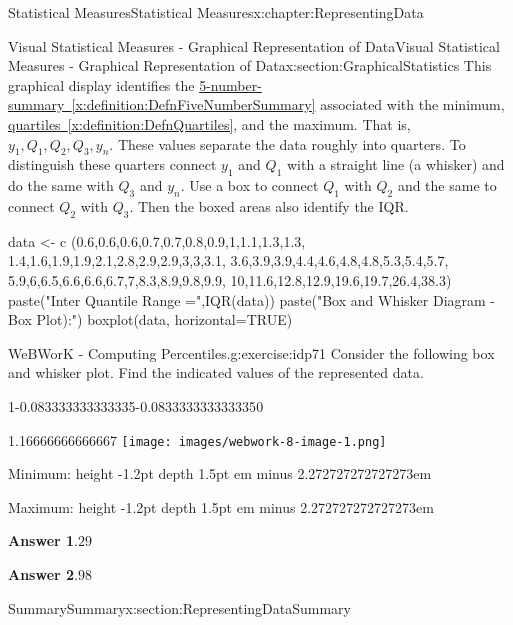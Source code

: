 \documentclass[oneside,10pt,]{book}
\newcommand{\blocktitlefont}{\relax}
\newcommand{\xreffont}{\relax}
\newcommand{\fillin}[1]{\leavevmode\leaders\vrule height -1.2pt depth 1.5pt \hskip #1em minus #1em \null}
\numberwithin{equation}{section}
\begin{document}
\begin{chapterptx}{Statistical Measures}{}{Statistical Measures}{}{}{x:chapter:RepresentingData}
\begin{sectionptx}{Visual Statistical Measures - Graphical Representation of Data}{}{Visual Statistical Measures - Graphical Representation of Data}{}{}{x:section:GraphicalStatistics}
\hypertarget{x:p:GraphicalStatisticsBoxAndWhisker}{}%
 This graphical display identifies the \hyperref[x:definition:DefnFiveNumberSummary]{5-number-summary~{\xreffont\ref{x:definition:DefnFiveNumberSummary}}} associated with the minimum, \hyperref[x:definition:DefnQuartiles]{quartiles~{\xreffont\ref{x:definition:DefnQuartiles}}}, and the maximum. That is, \(y_1, Q_1, Q_2, Q_3, y_n\).  These values separate the data roughly into quarters. To distinguish these quarters connect \(y_1\) and \(Q_1\) with a straight line (a whisker) and do the same with \(Q_3\) and \(y_n\). Use a box to connect \(Q_1\) with \(Q_2\) and the same to connect \(Q_2\) with \(Q_3\). Then the boxed areas also identify the IQR.%
%
\par
\leavevmode%
\begin{sageinput}
data <- c (0.6,0.6,0.6,0.7,0.7,0.8,0.9,1,1.1,1.3,1.3,
1.4,1.6,1.9,1.9,2.1,2.8,2.9,2.9,3,3,3.1,
3.6,3.9,3.9,4.4,4.6,4.8,4.8,5.3,5.4,5.7,
5.9,6,6.5,6.6,6.6,6.7,7,8.3,8.9,9.8,9.9,
10,11.6,12.8,12.9,19.6,19.7,26.4,38.3)
paste("Inter Quantile Range =",IQR(data))
paste("Box and Whisker Diagram - Box Plot):")
boxplot(data, horizontal=TRUE)
\end{sageinput}
%
\begin{inlineexercise}{WeBWorK - Computing Percentiles.}{g:exercise:idp71}%
Consider the following box and whisker plot.  Find the indicated values of the represented data.%
\begin{sidebyside}{1}{-0.083333333333335}{-0.083333333333335}{0}%
\begin{sbspanel}{1.16666666666667}%
\texttt{[image: images/webwork-8-image-1.png]}
\end{sbspanel}%
\end{sidebyside}%
\par
Minimum: \fillin{2.272727272727273}%
\par
Maximum: \fillin{2.272727272727273}%
\par\smallskip%
\noindent\textbf{\blocktitlefont Answer 1}.\hypertarget{g:answer:idp72}{}\quad{}\(29\)%
\par\smallskip%
\noindent\textbf{\blocktitlefont Answer 2}.\hypertarget{g:answer:idp73}{}\quad{}\(98\)%
\end{inlineexercise}%
\end{sectionptx}
%
%
\typeout{************************************************}
\typeout{************************************************}
%
\begin{sectionptx}{Summary}{}{Summary}{}{}{x:section:RepresentingDataSummary}

\end{sectionptx}
\end{chapterptx}
\end{document}
